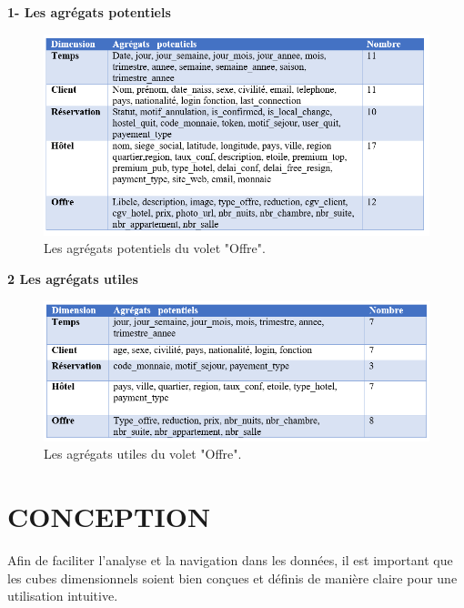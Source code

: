 \textbf{1- Les agrégats potentiels}

\begin{figure}[!htbp]
	\begin{center}
		\includegraphics[scale=0.65]{images/tab_agregat_pot_offre.png}
		\caption{Les agrégats potentiels du volet "Offre".}
		\label{use_bi_tools}
	\end{center}
	\end{figure}
\cleardoublepage
\textbf{2	Les agrégats utiles}
\begin{figure}[!htbp]
	\begin{center}
		\includegraphics[scale=0.65]{images/tab_agregat_uti_offre.png}
		\caption{Les agrégats utiles du volet "Offre".}
		\label{use_bi_tools}
	\end{center}
	\end{figure}
	 
\section{CONCEPTION}


 


Afin de faciliter l'analyse et la navigation dans les données, il est important que les cubes dimensionnels soient bien conçues et définis de manière claire pour une utilisation intuitive.\\

